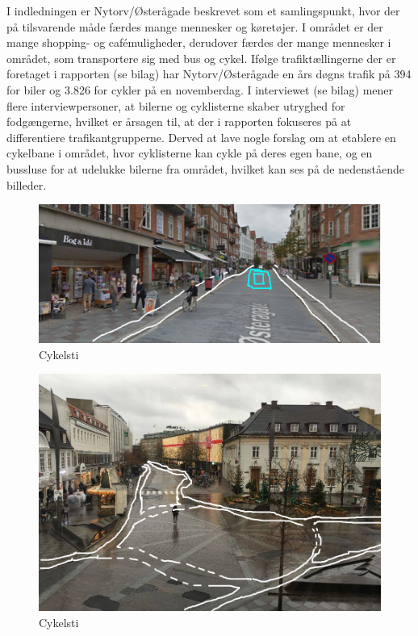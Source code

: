 I indledningen er Nytorv/Østerågade beskrevet som et samlingspunkt, hvor der på tilsvarende måde færdes mange mennesker og køretøjer. I området er der mange shopping- og cafémuligheder, derudover færdes der mange mennesker i området, som transportere sig med bus og cykel. Ifølge trafiktællingerne der er foretaget i rapporten (se bilag) har Nytorv/Østerågade en års døgns trafik på 394 for biler og 3.826 for cykler på en novemberdag. I interviewet (se bilag) mener flere interviewpersoner, at bilerne og cyklisterne skaber utryghed for fodgængerne, hvilket er årsagen til, at der i rapporten fokuseres på at differentiere trafikantgrupperne. Derved at lave nogle forslag om at etablere en cykelbane i området, hvor cyklisterne kan cykle på deres egen bane, og en bussluse for at udelukke bilerne fra området, hvilket kan ses på de nedenstående billeder.
\begin{figure}[htbp]
  \centering
  \begin{adjustbox}{max width=\textwidth}
    \includegraphics{figures/Billederogfigur/Losningsforslag_cykelsti/Cykelsti_gennem_bogo.png}
 \end{adjustbox}
  \caption{Cykelsti}
   \label{fig:cykelsti}
\end{figure}

\begin{figure}[htbp]
  \centering
  \begin{adjustbox}{max width=\textwidth}
    \includegraphics{figures/Billederogfigur/Losningsforslag_cykelsti/cykelsti_ved_knudepunktet.png}
 \end{adjustbox}
  \caption{Cykelsti}
   \label{fig:cykelsti}
\end{figure}

